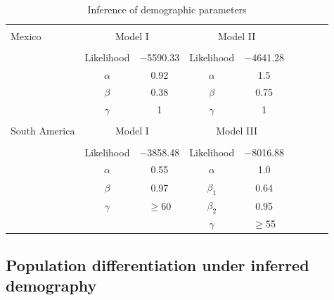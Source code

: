 \renewcommand{\arraystretch}{1.1}
\begin{table}[tb]

\begin{center}
 \caption[]{Inference of demographic parameters\hspace*{0.3cm}}
  \textbf{}\\[-2mm]
{\fontsize{7}{11}\sf
    \begin{tabular}{lcccccccl} \hline
       & & \\[-3mm]
     Mexico  & \multicolumn{2}{c}{Model I}  &\multicolumn{2}{c}{Model II}\\[0.1cm]
    \hline
    & & \\[-3mm]
   & Likelihood & $-$5590.33 & Likelihood &  $-$4641.28 \\
  &$\alpha$    & 0.92  & $\alpha$    & 1.5 \\
  &$\beta$ & 0.38  & $\beta$  & 0.75\\ 
  &$\gamma$   & 1        &  $\gamma$   & 1\\ 
      \hline
    & & \\[-3mm]
    South America  & \multicolumn{2}{c}{Model I}  &\multicolumn{2}{c}{Model III}\\[0.1cm]
        \hline
    & & \\[-3mm]
     & Likelihood &  $-$3858.48 & Likelihood &  $-$8016.88 \\
      &$\alpha$    & 0.55           & $\alpha$       & 1.0 \\
      &$\beta$ & 0.97           & $\beta_1$   & 0.64\\ 
      &$\gamma$   & $\geq$60   &  $\beta_2$  & 0.95\\ 
      &                &                     &  $\gamma$       & $\geq$55\\ [1mm]
    \hline
    \end{tabular}
    \label{param}  %
}
\end{center}
\end{table}
\renewcommand{\arraystretch}{1}



\subsection*{Population differentiation under inferred demography}

